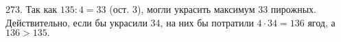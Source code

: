 273. Так как $135:4=33$ (ост. 3), могли украсить максимум 33 пирожных. Действительно, если бы украсили 34, на них бы потратили $4\cdot34=136$ ягод, а $136>135.$\\
